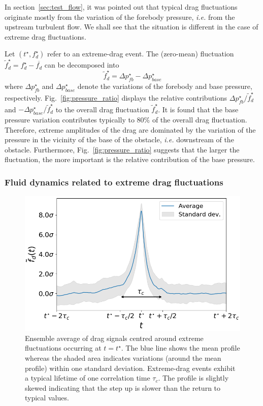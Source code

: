 \documentclass[pre,aps,floatfix,10pt,superscriptaddress, notitlepage,preprint]{revtex4-1}
\begin{document}
%
In section~\ref{sec:test_flow}, it was pointed out that typical drag fluctuations originate mostly from the variation of the forebody pressure, \textit{i.e.} from the upstream turbulent flow.
We shall see that the situation is different in the case of {extreme} drag fluctuations. 

%
Let $(t^{\star}, f_d^{\star})$ refer to an extreme-drag event.
The (zero-mean) fluctuation $\tilde{f}_d^{\star} = f_d^{\star} - \overline{f_d}$ can be  decomposed into 
\begin{equation}
  \tilde{f}_d^{\star} = \Delta p_{fb}^{\star} - \Delta p_{base}^{\star}
\end{equation}
where $\Delta p_{fb}^{\star}$ and $\Delta p_{base}^{\star}$ denote the variations of the forebody and base pressure, respectively.
%
Fig.~\ref{fig:pressure_ratio} displays the relative contributions
$\Delta p_{fb}^{\star}/\tilde{f}_d^{\star}$ and $-\Delta p_{base}^{\star}/\tilde{f}_d^{\star}$ to the overall drag fluctuation $\tilde f_d^{\star}$.
%
It is found that the base pressure variation contributes typically to $80\%$ of the overall drag fluctuation.
Therefore, extreme amplitudes of the drag are dominated by the variation of the pressure in the vicinity of the base of the obstacle, \emph{i.e.} downstream of the obstacle.
Furthermore, Fig.~\ref{fig:pressure_ratio} suggests that the larger the fluctuation, the more important is the relative contribution of the base pressure. 

\subsubsection{Fluid dynamics related to extreme drag fluctuations}
\label{sec:dynamical_aspects}

\begin{figure}
	\centering
	\includegraphics[width=.7\linewidth]{timeseries_extremes/timeseries_extremes.png}
	\caption{\label{fig:timeseries_extremes} Ensemble average of drag signals centred around extreme fluctuations occurring  at $t=t^{\star}$. The blue line shows the mean profile whereas the shaded area indicates variations (around the mean profile) within one standard deviation. Extreme-drag events exhibit a typical lifetime of one correlation time $\tau_c$. The profile is slightly skewed indicating that the step up is slower than the return to typical values.}
\end{figure}
\end{document}
